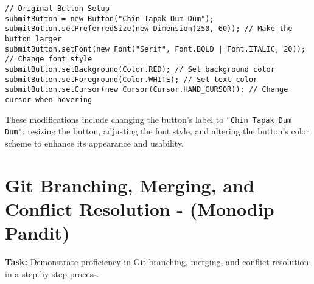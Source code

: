\documentclass[a4paper,15pt]{article}
\begin{document}
\begin{itemize}[leftmargin=1.5cm]
\begin{verbatim}
// Original Button Setup
submitButton = new Button("Chin Tapak Dum Dum");
submitButton.setPreferredSize(new Dimension(250, 60)); // Make the button larger
submitButton.setFont(new Font("Serif", Font.BOLD | Font.ITALIC, 20)); // Change font style
submitButton.setBackground(Color.RED); // Set background color
submitButton.setForeground(Color.WHITE); // Set text color
submitButton.setCursor(new Cursor(Cursor.HAND_CURSOR)); // Change cursor when hovering
\end{verbatim}

These modifications include changing the button's label to \texttt{"Chin Tapak Dum Dum"}, resizing the button, adjusting the font style, and altering the button's color scheme to enhance its appearance and usability.

 \end{itemize}
 \newpage

 \section{ Git Branching, Merging, and Conflict Resolution - (Monodip Pandit)}

\textbf{Task:} Demonstrate proficiency in Git branching, merging, and conflict resolution in a step-by-step process.
\end{document}
